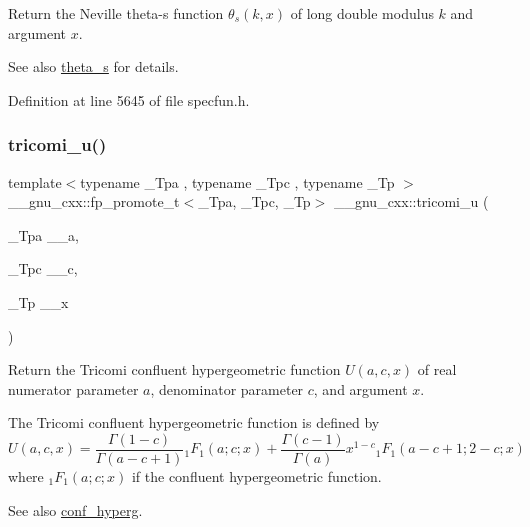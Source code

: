 Return the Neville theta-\/s function $ \theta_s(k,x) $ of {\ttfamily long double} modulus $ k $ and argument $ x $.

\begin{DoxySeeAlso}{See also}
\hyperlink{group__gnu__math__spec__func_gaf28f2dca107531890b49cccf2bdd67be}{theta\+\_\+s} for details. 
\end{DoxySeeAlso}


Definition at line 5645 of file specfun.\+h.

\mbox{\label{group__gnu__math__spec__func_gaf51a13fad85006e4d65c5b117e49f7d8}} 
\subsubsection{\texorpdfstring{tricomi\+\_\+u()}{tricomi\_u()}}
{\footnotesize\ttfamily template$<$typename \+\_\+\+Tpa , typename \+\_\+\+Tpc , typename \+\_\+\+Tp $>$ \\
\+\_\+\+\_\+gnu\+\_\+cxx\+::fp\+\_\+promote\+\_\+t$<$\+\_\+\+Tpa, \+\_\+\+Tpc, \+\_\+\+Tp$>$ \+\_\+\+\_\+gnu\+\_\+cxx\+::tricomi\+\_\+u (\begin{DoxyParamCaption}\item[{\+\_\+\+Tpa}]{\+\_\+\+\_\+a,  }\item[{\+\_\+\+Tpc}]{\+\_\+\+\_\+c,  }\item[{\+\_\+\+Tp}]{\+\_\+\+\_\+x }\end{DoxyParamCaption})\hspace{0.3cm}{\ttfamily [inline]}}

Return the Tricomi confluent hypergeometric function $ U(a,c,x) $ of real numerator parameter $ a $, denominator parameter $ c $, and argument $ x $.

The Tricomi confluent hypergeometric function is defined by \[ U(a,c,x) = \frac{\Gamma(1-c)}{\Gamma(a-c+1)} {}_1F_1(a;c;x) + \frac{\Gamma(c-1)}{\Gamma(a)} x^{1-c} {}_1F_1(a-c+1;2-c;x) \] where $ {}_1F_1(a;c;x) $ if the confluent hypergeometric function.

\begin{DoxySeeAlso}{See also}
\hyperlink{group__gnu__math__spec__func_ga4d01e85e7d295afca5d9f8b6c68f19cc}{conf\+\_\+hyperg}.
\end{DoxySeeAlso}

